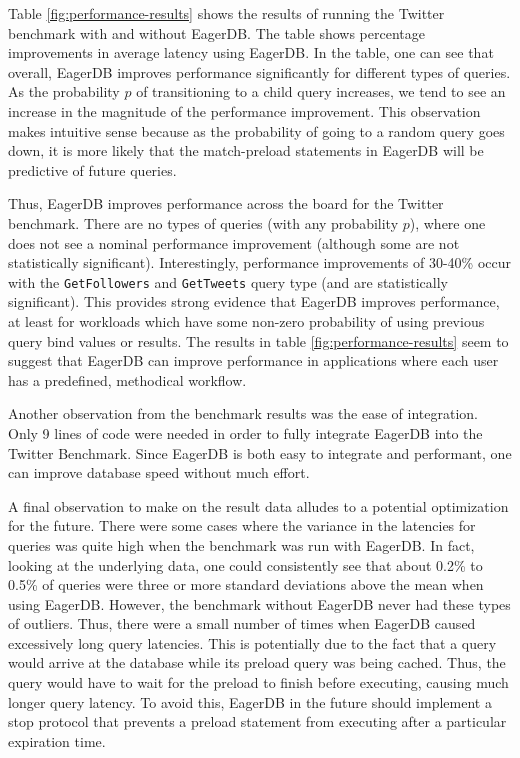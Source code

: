 \documentclass[12pt]{article}
\begin{document}
Table \ref{fig:performance-results} shows the results of running the Twitter benchmark with and without EagerDB. The table shows percentage improvements in average latency using EagerDB. In the table, one can see that overall, EagerDB improves performance significantly for different types of queries. As the probability $p$ of transitioning to a child query increases, we tend to see an increase in the magnitude of the performance improvement. This observation makes intuitive sense because as the probability of going to a random query goes down, it is more likely that the match-preload statements in EagerDB will be predictive of future queries.

Thus, EagerDB improves performance across the board for the Twitter benchmark. There are no types of queries (with any probability $p$), where one does not see a nominal performance improvement (although some are not statistically significant). Interestingly, performance improvements of 30-40\% occur with the \texttt{GetFollowers} and \texttt{GetTweets} query type (and are statistically significant). This provides strong evidence that EagerDB improves performance, at least for workloads which have some non-zero probability of using previous query bind values or results. The results in table \ref{fig:performance-results} seem to suggest that EagerDB can improve performance in applications where each user has a predefined, methodical workflow.

Another observation from the benchmark results was the ease of integration. Only 9 lines of code were needed in order to fully integrate EagerDB into the Twitter Benchmark. Since EagerDB is both easy to integrate and performant, one can improve database speed without much effort.

A final observation to make on the result data alludes to a potential optimization for the future. There were some cases where the variance in the latencies for queries was quite high when the benchmark was run with EagerDB. In fact, looking at the underlying data, one could consistently see that about 0.2\% to 0.5\% of queries were three or more standard deviations above the mean when using EagerDB. However, the benchmark without EagerDB never had these types of outliers. Thus, there were a small number of times when EagerDB caused excessively long query latencies. This is potentially due to the fact that a query would arrive at the database while its preload query was being cached. Thus, the query would have to wait for the preload to finish before executing, causing much longer query latency. To avoid this, EagerDB in the future should implement a stop protocol that prevents a preload statement from executing after a particular expiration time.
\end{document}
